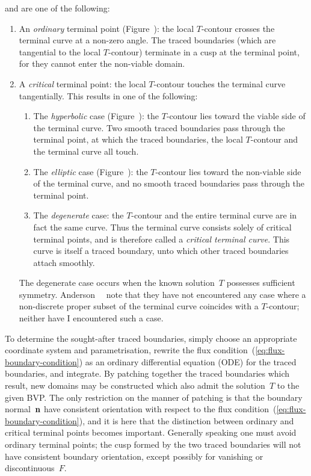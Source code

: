 and are one of the following:
\begin{enumerate}
  \item
    An \emph{ordinary} terminal point (Figure~\tbd):
    the local $T$-contour crosses the terminal curve at a non-zero angle.
    The traced boundaries (which are tangential to the local $T$-contour)
    terminate in a cusp at the terminal point,
    for they cannot enter the non-viable domain.
  \item
    A \emph{critical} terminal point:
    the local $T$-contour touches the terminal curve tangentially.
    This results in one of the following:
    \begin{enumerate}
      \item
        The \emph{hyperbolic} case (Figure~\tbd):
        the $T$-contour lies toward the viable side of the terminal curve.
        Two smooth traced boundaries pass through the terminal point,
        at which the traced boundaries,
        the local $T$-contour and the terminal curve
        all touch.
      \item
        The \emph{elliptic} case (Figure~\tbd):
        the $T$-contour lies toward the non-viable side of the terminal curve,
        and no smooth traced boundaries pass through the terminal point.
      \item
        The \emph{degenerate} case:
        the $T$-contour and the entire terminal curve
        are in fact the same curve.
        Thus the terminal curve consists solely of critical terminal points,
        and is therefore called a \emph{critical terminal curve}.
        This curve is itself a traced boundary,
        unto which other traced boundaries attach smoothly.
    \end{enumerate}
    The degenerate case occurs
    when the known solution~$T$ possesses sufficient symmetry.
    Anderson~\etal~\cite{anderson-2007-boundary-tracing-i-theory}
    note that they have not encountered any case
    where a non-discrete proper subset of the terminal curve
    coincides with a $T$-contour;
    neither have I encountered such a case.
\end{enumerate}

To determine the sought-after traced boundaries,
simply choose an appropriate coordinate system and parametrisation,
rewrite the flux condition~(\ref{eq:flux-boundary-condition})
as an ordinary differential equation (ODE) for the traced boundaries,
and integrate.
By patching together the traced boundaries which result,
new domains may be constructed
which also admit the solution~$T$ to the given BVP\@.
The only restriction on the manner of patching
is that the boundary normal~$\mathop{}\!\boldsymbol{\mathrm{n}}$ have consistent orientation
with respect to the flux condition~(\ref{eq:flux-boundary-condition}),
and it is here that
the distinction between ordinary and critical terminal points
becomes important.
Generally speaking one must avoid ordinary terminal points;
the cusp formed by the two traced boundaries
will not have consistent boundary orientation,
except possibly for vanishing or discontinuous~$F$.

